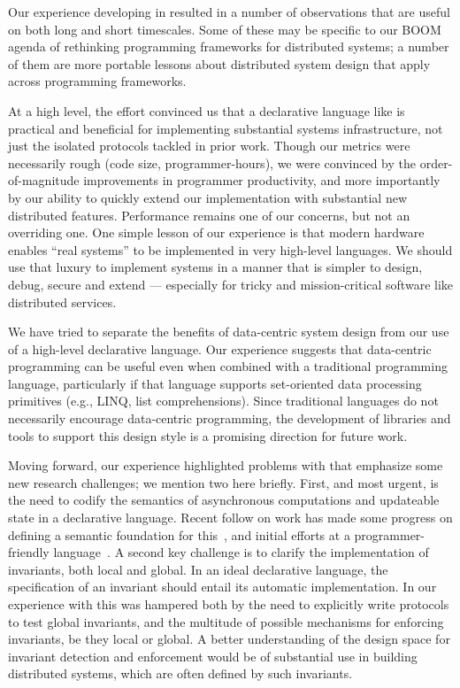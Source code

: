 Our experience developing \BOOMA in \OVERLOG resulted in a number of
observations that are useful on both long and short timescales.  Some of these
may be specific to our BOOM agenda of rethinking programming frameworks for
distributed systems; a number of them are more portable lessons about
distributed system design that apply across programming frameworks.

At a high level, the effort convinced us that a declarative language like
\OVERLOG is practical and beneficial for implementing substantial systems
infrastructure, not just the isolated protocols tackled in prior work.  Though
our metrics were necessarily rough (code size, programmer-hours), we were
convinced by the order-of-magnitude improvements in programmer productivity,
and more importantly by our ability to quickly extend our implementation with
substantial new distributed features.  Performance remains one of our concerns,
but not an overriding one.  One simple lesson of our experience is that modern
hardware enables ``real systems'' to be implemented in very high-level
languages.  We should use that luxury to implement systems in a manner that is
simpler to design, debug, secure and extend --- especially for tricky and
mission-critical software like distributed services.

We have tried to separate the benefits of data-centric system design from our 
use of a high-level declarative language. Our experience suggests that
data-centric programming can be useful even when combined with a traditional
programming language, particularly if that language supports set-oriented data
processing primitives (e.g., LINQ, list comprehensions). Since traditional
languages do not necessarily encourage data-centric programming, the development
of libraries and tools to support this design style is a promising direction for 
future work.

Moving forward, our experience highlighted problems with \OVERLOG that
emphasize some new research challenges; we mention two here briefly.  First,
and most urgent, is the need to codify the semantics of asynchronous
computations and updateable state in a declarative language.  Recent follow on
work has made some progress on defining a semantic foundation for
this~\cite{dedalus-tr}, and initial efforts at a programmer-friendly
language~\cite{calm-cidr}.  A second key challenge is to clarify the
implementation of invariants, both local and global.  In an ideal declarative
language, the specification of an invariant should entail its automatic
implementation.  In our experience with \OVERLOG this was hampered both by the
need to explicitly write protocols to test global invariants, and the multitude
of possible mechanisms for enforcing invariants, be they local or global.  A
better understanding of the design space for invariant detection and
enforcement would be of substantial use in building distributed systems, which
are often defined by such invariants.


